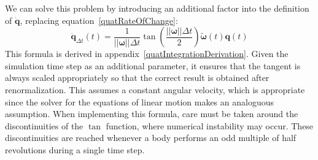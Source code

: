 We can solve this problem by introducing an additional factor into the definition of
$\dot{\mathbf{q}}$, replacing equation~\ref{quatRateOfChange}:
\begin{equation}
\label{quatRateOfChangeCorrected}
\dot{\mathbf{q}}_{\Delta t}(t) = \frac{1}{||\bm{\omega}||\Delta t}
    \tan\left(\frac{||\bm{\omega}||\Delta t}{2}\right)
    \tilde{\bm{\omega}}(t)\mathbf{q}(t)
\end{equation}
This formula is derived in appendix~\ref{quatIntegrationDerivation}. Given the simulation time
step as an additional parameter, it ensures that the tangent is always scaled appropriately so
that the correct result is obtained after renormalization. This assumes a constant angular
velocity, which is appropriate since the solver for the equations of linear motion makes an
analoguous assumption. When implementing this formula, care must be taken around the
discontinuities of the $\tan$ function, where numerical instability may occur. These
discontinuities are reached whenever a body performs an odd multiple of half
revolutions during a single time step.
